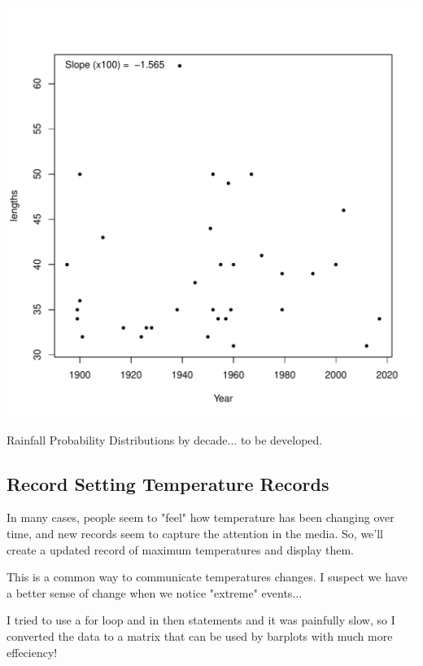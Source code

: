 \documentclass{article}\usepackage[]{graphicx}\usepackage[]{color}
\makeatletter
\def\maxwidth{ %
  \ifdim\Gin@nat@width>\linewidth
    \linewidth
  \else
    \Gin@nat@width
  \fi
}
\newenvironment{kframe}{%
 \def\at@end@of@kframe{}%
 \ifinner\ifhmode%
  \def\at@end@of@kframe{\end{minipage}}%
  \begin{minipage}{\columnwidth}%
 \fi\fi%
 \def\FrameCommand##1{\hskip\@totalleftmargin \hskip-\fboxsep
 \colorbox{shadecolor}{##1}\hskip-\fboxsep
     \hskip-\linewidth \hskip-\@totalleftmargin \hskip\columnwidth}%
 \MakeFramed {\advance\hsize-\width
   \@totalleftmargin\z@ \linewidth\hsize
   \@setminipage}}%
 {\par\unskip\endMakeFramed%
 \at@end@of@kframe}
\newenvironment{knitrout}{}{} %
\makeatother
\begin{document}
\begin{knitrout}
\begin{kframe}
{\ttfamily\noindent\bfseries\color{errorcolor}{\#\# Error in is.data.frame(data): object 'Drought.run.100' not found}}\end{kframe}
\includegraphics[width=\maxwidth]{figure/unnamed-chunk-11-2} 
\end{knitrout}

Rainfall Probability Distributions by decade... to be developed.





\subsection{Record Setting Temperature Records}

In many cases, people seem to "feel" how temperature has been changing over time, and new records seem to capture the attention in the media. So, we'll create a updated record of maximum temperatures and display them. 





This is a common way to communicate temperatures changes. I suspect we have a better sense of change when we notice "extreme" events...






I tried to use a for loop and in then statements and it was painfully slow, so I converted the data to a matrix that can be used by barplots with much more effeciency!
\end{document}
